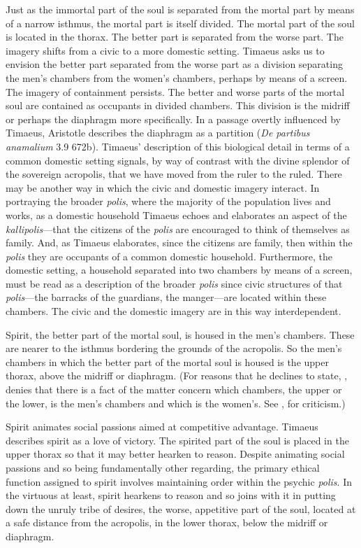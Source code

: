 Just as the immortal part of the soul is separated from the mortal part by means of a narrow isthmus, the mortal part is itself divided. The mortal part of the soul is located in the thorax. The better part is separated from the worse part. The imagery shifts from a civic to a more domestic setting. Timaeus asks us to envision the better part separated from the worse part as a division separating the men's chambers from the women's chambers, perhaps by means of a screen. The imagery of containment persists. The better and worse parts of the mortal soul are contained as occupants in divided chambers. This division is the midriff or perhaps the diaphragm more specifically. In a passage overtly influenced by Timaeus, Aristotle describes the diaphragm as a partition (\emph{De partibus anamalium} 3.9 672b). Timaeus' description of this biological detail in terms of a common domestic setting signals, by way of contrast with the divine splendor of the sovereign acropolis, that we have moved from the ruler to the ruled. There may be another way in which the civic and domestic imagery interact. In portraying the broader \emph{polis}, where the majority of the population lives and works, as a domestic household Timaeus echoes and elaborates an aspect of the \emph{kallipolis}---that the citizens of the \emph{polis} are encouraged to think of themselves as family. And, as Timaeus elaborates, since the citizens are family, then within the \emph{polis} they are occupants of a common domestic household. Furthermore, the domestic setting, a household separated into two chambers by means of a screen, must be read as a description of the broader \emph{polis} since civic structures of that \emph{polis}---the barracks of the guardians, the manger---are located within these chambers. The civic and the domestic imagery are in this way interdependent.

Spirit, the better part of the mortal soul, is housed in the men's chambers. These are nearer to the isthmus bordering the grounds of the acropolis. So the men's chambers in which the better part of the mortal soul is housed is the upper thorax, above the midriff or diaphragm. (For reasons that he declines to state, \citealt[257 n13]{Archer-Hind:1888qd}, denies that there is a fact of the matter concern which chambers, the upper or the lower, is the men's chambers and which is the women's. See \citealt[501]{Taylor:1928qb}, for criticism.)

Spirit animates social passions aimed at competitive advantage. Timaeus describes spirit as a love of victory. The spirited part of the soul is placed in the upper thorax so that it may better hearken to reason. Despite animating social passions and so being fundamentally other regarding, the primary ethical function assigned to spirit involves maintaining order within the psychic \emph{polis}. In the virtuous at least, spirit hearkens to reason and so joins with it in putting down the unruly tribe of desires, the worse, appetitive part of the soul, located at a safe distance from the acropolis, in the lower thorax, below the midriff or diaphragm.

